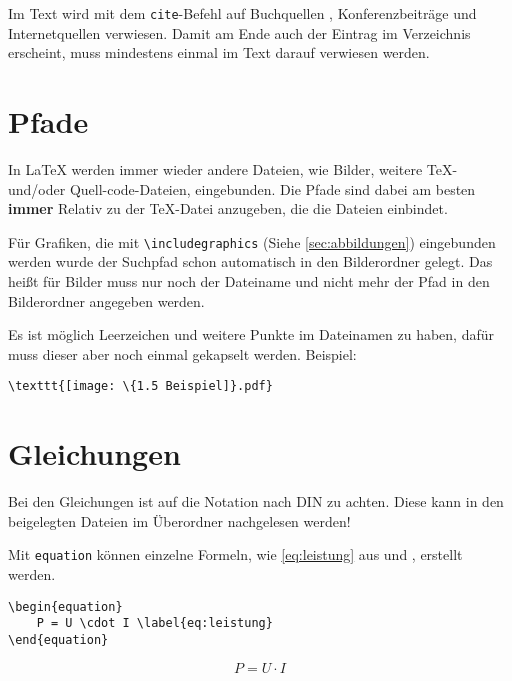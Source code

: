 Im Text wird mit dem \verb|cite|-Befehl auf Buchquellen \cite[12]{BeuthLeistung}, Konferenzbeiträge \cite[52\psq]{DoppelbauerHEF} und Internetquellen \cite[84\psqq]{HoffmannHybrid} verwiesen.\cite{MeyerLeistung} Damit am Ende auch der Eintrag im Verzeichnis erscheint, muss mindestens einmal im Text darauf verwiesen werden.

\section{Pfade}
In \LaTeX{} werden immer wieder andere Dateien, wie Bilder, weitere TeX- und/oder Quell-code-Dateien, eingebunden. Die Pfade sind dabei am besten \textbf{immer} Relativ zu der TeX-Datei anzugeben, die die Dateien einbindet. 

Für Grafiken, die mit \verb|\includegraphics| (Siehe \autoref{sec:abbildungen}) eingebunden werden wurde der Suchpfad schon automatisch in den Bilderordner gelegt. Das heißt für Bilder muss nur noch der Dateiname und nicht mehr der Pfad in den Bilderordner angegeben werden.

Es ist möglich Leerzeichen und weitere Punkte im Dateinamen zu haben, dafür muss dieser aber noch einmal gekapselt werden. Beispiel:
\begin{lstlisting}[style=latex]
\texttt{[image: \{1.5 Beispiel]}.pdf}
\end{lstlisting}

\section{Gleichungen}
Bei den Gleichungen ist auf die Notation nach DIN zu achten. Diese kann in den beigelegten Dateien im Überordner nachgelesen werden!

Mit \verb|equation| können einzelne Formeln, wie \autoref{eq:leistung} aus \cite{DoesselLEN} und \cite{SiegelES}, erstellt werden.
\begin{lstlisting}[style=latex]
\begin{equation}
	P = U \cdot I \label{eq:leistung}
\end{equation}
\end{lstlisting}
\begin{equation}
	P = U \cdot I \label{eq:leistung}
\end{equation}

